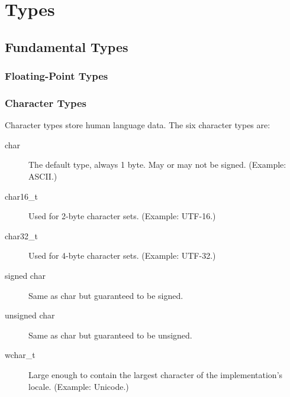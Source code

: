 \chapter{Types}
\section{Fundamental Types}
\subsection{Floating-Point Types}
\subsection{Character Types}
Character types store human language data. The six character types are:
\begin{description}
    \item[char] The default type, always 1 byte. May or may not be signed. (Example: ASCII.)
    \item[char16\_t] Used for 2-byte character sets. (Example: UTF-16.)
    \item[char32\_t] Used for 4-byte character sets. (Example: UTF-32.)
    \item[signed char] Same as char but guaranteed to be signed.
    \item[unsigned char] Same as char but guaranteed to be unsigned.
    \item[wchar\_t] Large enough to contain the largest character of the implementation's locale. (Example: Unicode.)
\end{description}
